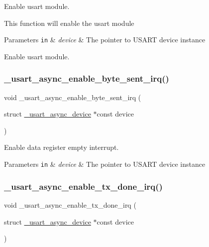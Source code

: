 Enable usart module. 

This function will enable the usart module


\begin{DoxyParams}[1]{Parameters}
\mbox{\tt in}  & {\em device} & The pointer to U\+S\+A\+RT device instance\\
\hline
\end{DoxyParams}
Enable usart module. \mbox{\label{group___h_p_l_ga5dcb14840b2011da3a1d0f774dafa28d}} 
\subsubsection{\texorpdfstring{\+\_\+usart\+\_\+async\+\_\+enable\+\_\+byte\+\_\+sent\+\_\+irq()}{\_usart\_async\_enable\_byte\_sent\_irq()}}
{\footnotesize\ttfamily void \+\_\+usart\+\_\+async\+\_\+enable\+\_\+byte\+\_\+sent\+\_\+irq (\begin{DoxyParamCaption}\item[{struct \hyperlink{struct__usart__async__device}{\+\_\+usart\+\_\+async\+\_\+device} $\ast$const}]{device }\end{DoxyParamCaption})}



Enable data register empty interrupt. 


\begin{DoxyParams}[1]{Parameters}
\mbox{\tt in}  & {\em device} & The pointer to U\+S\+A\+RT device instance \\
\hline
\end{DoxyParams}
\mbox{\label{group___h_p_l_ga89bf3d02a7a3cca261900906ffd9ca76}} 
\subsubsection{\texorpdfstring{\+\_\+usart\+\_\+async\+\_\+enable\+\_\+tx\+\_\+done\+\_\+irq()}{\_usart\_async\_enable\_tx\_done\_irq()}}
{\footnotesize\ttfamily void \+\_\+usart\+\_\+async\+\_\+enable\+\_\+tx\+\_\+done\+\_\+irq (\begin{DoxyParamCaption}\item[{struct \hyperlink{struct__usart__async__device}{\+\_\+usart\+\_\+async\+\_\+device} $\ast$const}]{device }\end{DoxyParamCaption})}



